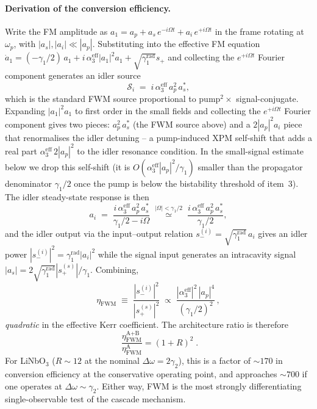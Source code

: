 \documentclass[11pt,a4paper]{article}
\newcommand{\Dom}{\Delta\omega}
\begin{document}
\paragraph*{Derivation of the conversion efficiency.}
Write the FM amplitude as $a_1=a_p+a_s\,e^{-i\Omega t}+a_i\,e^{+i\Omega t}$
in the frame rotating at $\omega_p$, with $|a_s|,|a_i|\ll|a_p|$.
Substituting into the effective FM equation
$\dot a_1 = (-\gamma_1/2)\,a_1+i\,\alpha_3^\text{eff}|a_1|^{2}a_1
+\sqrt{\gamma_1^\text{rad}}s_+$ and collecting the $e^{+i\Omega t}$
Fourier component generates an idler source
\begin{equation*}
  \mathcal{S}_i\;=\;i\,\alpha_3^\text{eff}\,a_p^{2}\,a_s^{*},
\end{equation*}
which is the standard FWM source proportional to pump${}^{2}\times$
signal-conjugate.  Expanding $|a_1|^{2}a_1$ to first order in the
small fields and collecting the $e^{+i\Omega t}$ Fourier component
gives two pieces: $a_p^{2}\,a_s^{*}$ (the FWM source above) and a
$2|a_p|^{2}a_i$ piece that renormalises the idler detuning -- a
pump-induced XPM self-shift that adds a real part
$\alpha_3^\text{eff}\,2|a_p|^{2}$ to the idler resonance condition.
In the small-signal estimate below we drop this self-shift (it is
$O(\alpha_3^\text{eff}|a_p|^2/\gamma_1)$ smaller than the propagator
denominator $\gamma_1/2$ once the pump is below the bistability
threshold of item~3).  The idler steady-state response is then
\begin{equation*}
  a_i \;=\; \frac{i\,\alpha_3^\text{eff}\,a_p^{2}\,a_s^{*}}{\gamma_1/2-i\Omega}
       \;\stackrel{|\Omega|<\gamma_1/2}{\simeq}\;
       \frac{i\,\alpha_3^\text{eff}\,a_p^{2}\,a_s^{*}}{\gamma_1/2},
\end{equation*}
and the idler output via the input--output relation
$s_-^{(i)}=\sqrt{\gamma_1^\text{rad}}\,a_i$ gives an idler power
$|s_-^{(i)}|^{2}=\gamma_1^\text{rad}|a_i|^{2}$ while the signal input
generates an intracavity signal
$|a_s|=2\sqrt{\gamma_1^\text{rad}}|s_+^{(s)}|/\gamma_1$.  Combining,
\begin{equation}
  \eta_\text{FWM}\;\equiv\;\frac{|s_-^{(i)}|^{2}}{|s_+^{(s)}|^{2}}
  \;\propto\;\frac{|\alpha_3^\text{eff}|^{2}\,|a_p|^{4}}{(\gamma_1/2)^{2}}\,,
  \label{eq:eta-FWM}
\end{equation}
\emph{quadratic} in the effective Kerr coefficient.  The architecture
ratio is therefore
\begin{equation}
  \boxed{\;\frac{\eta_\text{FWM}^{\text{A+B}}}{\eta_\text{FWM}^{\text{A}}}=(1+R)^{2}\;.}
\end{equation}
For LiNbO$_3$ ($R\sim 12$ at the nominal $\Dom=2\gamma_2$), this is a
factor of $\sim 170$ in conversion efficiency at the conservative
operating point, and approaches $\sim 700$ if one operates at
$\Dom\sim\gamma_2$.  Either way, FWM is the most strongly
differentiating single-observable test of the cascade mechanism.
\end{document}
